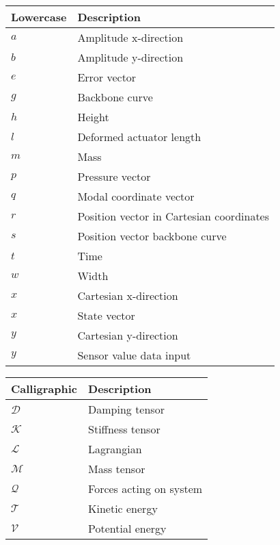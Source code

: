 \begin{spacing}{0.9}
\begin{multicols}{2}
\begin{table}[H]
\centering
    \begin{tabular}{p{1.7cm} p{4.8cm}} \hline
    \textbf{Lowercase}    &   \textbf{Description }\\ \hline
     $a$     & Amplitude x-direction \\
     $b$     & Amplitude y-direction \\
     $e$     & Error vector \\
     $g$     & Backbone curve \\
     $h$     & Height \\
     $l$     & Deformed actuator length \\
     $m$     & Mass \\
     $p$     & Pressure vector \\
     $q$     & Modal coordinate vector \\
     $r$     & Position vector in Cartesian coordinates \\
     $s$     & Position vector backbone curve \\
     $t$     & Time \\
     $w$     & Width \\
     $x$     & Cartesian x-direction \\
     $x$     & State vector \\
     $y$     & Cartesian y-direction \\
     $y$     & Sensor value data input \\ \hline
    \end{tabular}
\end{table}



\begin{table}[H]
\centering
    \begin{tabular}{p{2.5cm} p{4cm}} \hline
    \textbf{Calligraphic}    &   \textbf{Description }\\ \hline

    $\mathcal{D}$     &  Damping tensor \\
    $\mathcal{K}$     &  Stiffness tensor \\
    $\mathcal{L}$     &  Lagrangian \\
    $\mathcal{M}$     &  Mass tensor \\
    $\mathcal{Q}$     &  Forces acting on system \\
    $\mathcal{T}$     &  Kinetic energy \\
    $\mathcal{V}$     &  Potential energy \\ \hline
    \end{tabular}
\end{table}




\end{multicols}
\end{spacing}

